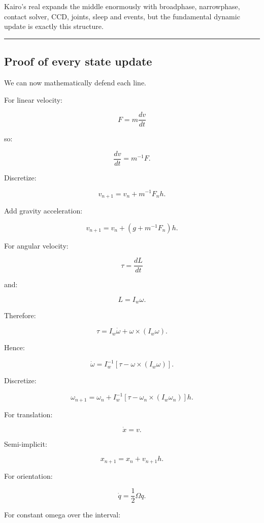 Kairo's real  expands the middle enormously with broadphase, narrowphase, contact solver, CCD, joints, sleep and events, but the fundamental dynamic update is exactly this structure.

\begin{center}\rule{0.5\linewidth}{0.5pt}\end{center}

\subsection{Proof of every state update}\label{06-engine-ii-ch039-proof-of-every-state-update}

\hypertarget{06-engine-ii-ch039-proof-of-every-state-update}{}

We can now mathematically defend each line.

For linear velocity:

\[
F=m\frac{dv}{dt}
\]

so:

\[
\frac{dv}{dt}=m^{-1}F.
\]

Discretize:

\[
\boxed{
v_{n+1}
=
v_n+
m^{-1}F_nh.
}
\]

Add gravity acceleration:

\[
\boxed{
v_{n+1}
=
v_n+
(g+m^{-1}F_n)h.
}
\]

For angular velocity:

\[
\tau
=
\frac{dL}{dt}
\]

and:

\[
L=I_w\omega.
\]

Therefore:

\[
\tau
=
I_w\dot\omega+
\omega\times(I_w\omega).
\]

Hence:

\[
\boxed{
\dot\omega
=
I_w^{-1}
[
\tau-
\omega\times(I_w\omega)
].
}
\]

Discretize:

\[
\boxed{
\omega_{n+1}
=
\omega_n+
I_w^{-1}
[
\tau-
\omega_n\times(I_w\omega_n)
]h.
}
\]

For translation:

\[
\dot x=v.
\]

Semi-implicit:

\[
\boxed{
x_{n+1}
=
x_n+
v_{n+1}h.
}
\]

For orientation:

\[
\dot q
=
\frac12\Omega q.
\]

For constant omega over the interval:

